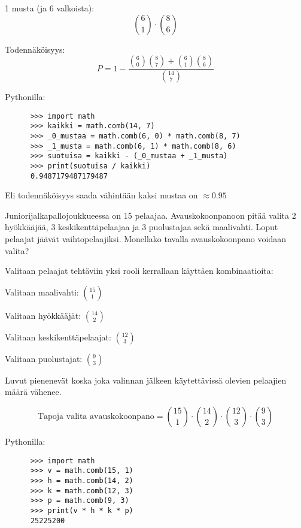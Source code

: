 \documentclass[12pt,a4paper]{article}
\begin{document}
\begin{kohta}
\begin{alakohta}
    \item 1 musta (ja 6 valkoista):
    \[
    \binom{6}{1} \cdot \binom{8}{6}
    \]
  \end{alakohta}

\vspace{0.8cm}

  Todennäköisyys:
  \[
P = 1 - \frac{\binom{6}{0}\binom{8}{7} + \binom{6}{1}\binom{8}{6}}{\binom{14}{7}}
  \]

    Pythonilla:
    \begin{verbatim}
      >>> import math
      >>> kaikki = math.comb(14, 7)
      >>> _0_mustaa = math.comb(6, 0) * math.comb(8, 7)
      >>> _1_musta = math.comb(6, 1) * math.comb(8, 6)
      >>> suotuisa = kaikki - (_0_mustaa + _1_musta)
      >>> print(suotuisa / kaikki)
      0.9487179487179487
    \end{verbatim}
Eli todennäköisyys saada vähintään kaksi mustaa on $\approx 0.95$

\end{kohta}


\newpage
{}
Juniorijalkapallojoukkueessa on 15 pelaajaa.
Avauskokoonpanoon pitää valita 2 hyökkääjää,
3 keskikenttäpelaajaa ja 3 puolustajaa sekä maalivahti.
Loput pelaajat jäävät vaihtopelaajiksi.
Monellako tavalla avauskokoonpano voidaan valita? 
\vspace{0.4cm}

Valitaan pelaajat tehtäviin yksi rooli kerrallaan käyttäen kombinaatioita:

\begin{alakohta}
  \item Valitaan maalivahti: $\binom{15}{1}$
  \item Valitaan hyökkääjät: $\binom{14}{2}$
  \item Valitaan keskikenttäpelaajat: $\binom{12}{3}$
  \item Valitaan puolustajat: $\binom{9}{3}$
\end{alakohta}

Luvut pienenevät koska joka valinnan jälkeen käytettävissä
olevien pelaajien määrä vähenee.

\[
\text{Tapoja valita avauskokoonpano} = 
\binom{15}{1} \cdot 
\binom{14}{2} \cdot 
\binom{12}{3} \cdot 
\binom{9}{3}
\]

    Pythonilla:
    \begin{verbatim}
      >>> import math
      >>> v = math.comb(15, 1)
      >>> h = math.comb(14, 2)
      >>> k = math.comb(12, 3)
      >>> p = math.comb(9, 3)
      >>> print(v * h * k * p)
      25225200
    \end{verbatim}
\end{document}
